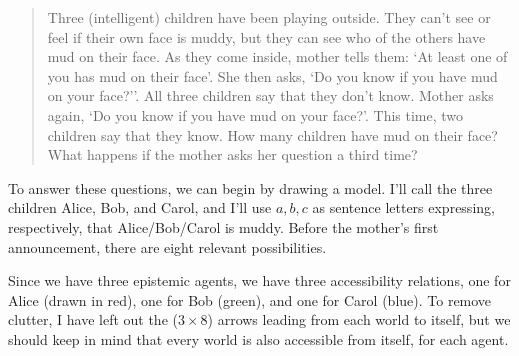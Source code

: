 \begin{quote}
  Three (intelligent) children have been playing outside. They can't see or feel
  if their own face is muddy, but they can see who of the others have mud on
  their face. As they come inside, mother tells them: `At least one of you has mud on
  their face'. She then asks, `Do you know if you have mud on your face?''.
  All three children say that they don't know. Mother asks again, `Do you know
  if you have mud on your face?'. This time, two children say that they know.
  How many children have mud on their face? What happens if the mother
  asks her question a third time?
\end{quote}

To answer these questions, we can begin by drawing a model. I'll call the three
children Alice, Bob, and Carol, and I'll use $a,b,c$ as sentence letters
expressing, respectively, that Alice/Bob/Carol is muddy. Before the mother's first announcement, there are eight relevant possibilities.

\begin{center}
\end{center}
%
Since we have three epistemic agents, we have three accessibility relations, one
for Alice (drawn in red), one for Bob (green), and one for Carol (blue). To
remove clutter, I have left out the ($3\times 8$) arrows leading from each
world to itself, but we should keep in mind that every world is also accessible
from itself, for each agent.

